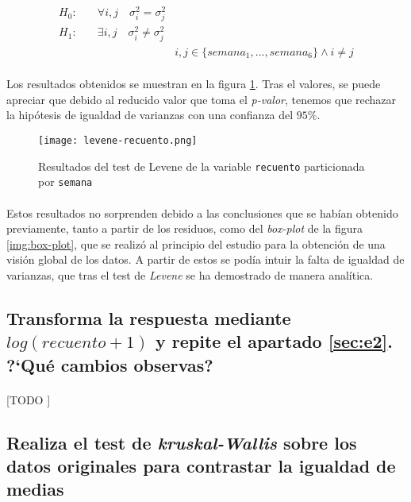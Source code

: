 \documentclass[11pt]{article}
\begin{document}
      \begin{align*}
        H_0:& \quad \forall i,j \quad \sigma^2_{i} = \sigma^2_{j} & \\
        H_1:& \quad \exists i,j \quad \sigma^2_{i} \neq \sigma^2_{j} & \\
        & & i,j \in \{semana_1,...,semana_6\} \land i \neq j
      \end{align*}

      \paragraph{}
      Los resultados obtenidos se muestran en la figura \ref{img:levene-test}. Tras el valores, se puede apreciar que debido al reducido valor que toma el \emph{p-valor}, tenemos que rechazar la hipótesis de igualdad de varianzas con una confianza del $95\%$.

      \begin{figure}[!h]
        \centering
        \texttt{[image: levene-recuento.png]}
        \caption{Resultados del test de Levene de la variable \texttt{recuento} particionada por \texttt{semana}}
        \label{img:levene-test}
      \end{figure}

      \paragraph{}
      Estos resultados no sorprenden debido a las conclusiones que se habían obtenido previamente, tanto a partir de los residuos, como del \emph{box-plot} de la figura \ref{img:box-plot}, que se realizó al principio del estudio para la obtención de una visión global de los datos. A partir de estos se podía intuir la falta de igualdad de varianzas, que tras el test de \emph{Levene} se ha demostrado de manera analítica.


    \subsection{Transforma la respuesta mediante $log(recuento + 1)$ y repite el apartado \ref{sec:e2}. ?`Qué cambios observas?}
    \label{sec:e4}

      \paragraph{}
      [TODO ]


    \subsection{Realiza el test de \emph{kruskal-Wallis} sobre los datos originales para contrastar la igualdad de medias}
    \label{sec:e5}
\end{document}
